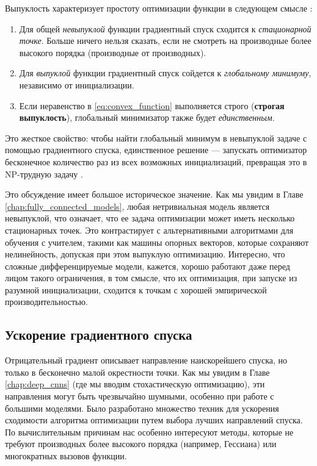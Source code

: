 Выпуклость характеризует простоту оптимизации функции в следующем смысле \cite{jain2017non}:
%
\begin{enumerate}
    \item Для общей \textit{невыпуклой} функции градиентный спуск сходится к \textit{стационарной точке}. Больше ничего нельзя сказать, если не смотреть на производные более высокого порядка (производные от производных).
    \item Для \textit{выпуклой} функции градиентный спуск сойдется к \textit{глобальному минимуму}, независимо от инициализации.
    \item  Если неравенство в \eqref{eq:convex_function} выполняется строго (\textbf{строгая выпуклость}), глобальный минимизатор также будет \textit{единственным}.
\end{enumerate}

Это жесткое свойство: чтобы найти глобальный минимум в невыпуклой задаче с помощью градиентного спуска, единственное решение — запускать оптимизатор бесконечное количество раз из всех возможных инициализаций, превращая это в NP-трудную задачу \cite{jain2017non}.

Это обсуждение имеет большое историческое значение. Как мы увидим в Главе \ref{chap:fully_connected_models}, любая нетривиальная модель является невыпуклой, что означает, что ее задача оптимизации может иметь несколько стационарных точек. Это контрастирует с альтернативными алгоритмами для обучения с учителем, такими как машины опорных векторов, которые сохраняют нелинейность, допуская при этом выпуклую оптимизацию. Интересно, что сложные дифференцируемые модели, кажется, хорошо работают даже перед лицом такого ограничения, в том смысле, что их оптимизация, при запуске из разумной инициализации, сходится к точкам с хорошей эмпирической производительностью.

\subsection{Ускорение градиентного спуска}
Отрицательный градиент описывает направление наискорейшего спуска, но только в бесконечно малой окрестности точки. Как мы увидим в Главе \ref{chap:deep_cnns} (где мы вводим стохастическую оптимизацию), эти направления могут быть чрезвычайно шумными, особенно при работе с большими моделями. Было разработано множество техник для ускорения сходимости алгоритма оптимизации путем выбора лучших направлений спуска. По вычислительным причинам нас особенно интересуют методы, которые не требуют производных более высокого порядка (например, Гессиана) или многократных вызовов функции.

